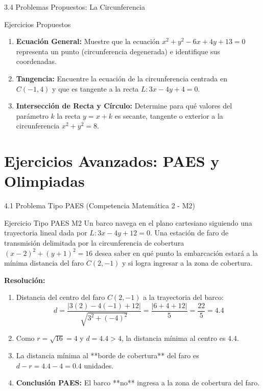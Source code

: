 \documentclass[10pt,aspectratio=169,spanish]{beamer}
\begin{document}
\begin{frame}{3.4 Problemas Propuestos: La Circunferencia}
\begin{block}{Ejercicios Propuestos}
\begin{enumerate}
    \item \textbf{Ecuación General:} Muestre que la ecuación $x^2 + y^2 - 6x + 4y + 13 = 0$ representa un punto (circunferencia degenerada) e identifique sus coordenadas.
    \item \textbf{Tangencia:} Encuentre la ecuación de la circunferencia centrada en $C(-1, 4)$ y que es tangente a la recta $L: 3x - 4y + 4 = 0$.
    \item \textbf{Intersección de Recta y Círculo:} Determine para qué valores del parámetro $k$ la recta $y = x + k$ es secante, tangente o exterior a la circunferencia $x^2 + y^2 = 8$.
\end{enumerate}
\end{block}
\end{frame}
\section{Ejercicios Avanzados: PAES y Olimpiadas}

\begin{frame}{4.1 Problema Tipo PAES (Competencia Matemática 2 - M2)}
\begin{alertblock}{Ejercicio Tipo PAES M2}
Un barco navega en el plano cartesiano siguiendo una trayectoria lineal dada por $L: 3x - 4y + 12 = 0$. Una estación de faro de transmisión delimitada por la circunferencia de cobertura $(x-2)^2 + (y+1)^2 = 16$ desea saber en qué punto la embarcación estará a la mínima distancia del faro $C(2,-1)$ y si logra ingresar a la zona de cobertura.
\end{alertblock}

\pause
\textbf{Resolución:}
\begin{enumerate}
  \item Distancia del centro del faro $C(2,-1)$ a la trayectoria del barco:
  \[
    d = \frac{|3(2) - 4(-1) + 12|}{\sqrt{3^2 + (-4)^2}} = \frac{|6 + 4 + 12|}{5} = \frac{22}{5} = 4.4
  \]
  \item Como $r = \sqrt{16} = 4$ y $d = 4.4 > 4$, la distancia mínima al centro es $4.4$.
  \item La distancia mínima al **borde de cobertura** del faro es $d - r = 4.4 - 4 = 0.4$ unidades.
  \item \textbf{Conclusión PAES:} El barco **no** ingresa a la zona de cobertura del faro.
\end{enumerate}
\end{frame}
\end{document}
